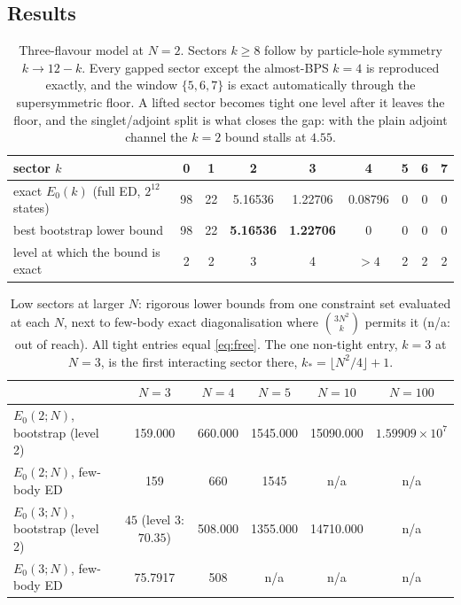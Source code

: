 \documentclass[10pt]{article}
\begin{document}
\subsection{Results}

\begin{table}[t]\centering\small
\begin{tabular}{@{}lcccccccc@{}}\toprule
sector $k$ & 0 & 1 & 2 & 3 & 4 & 5 & 6 & 7\\\midrule
exact $E_0(k)$ (full ED, $2^{12}$ states) & 98 & 22 & 5.16536 & 1.22706 & 0.08796 & 0 & 0 & 0\\
best bootstrap lower bound & 98 & 22 & \textbf{5.16536} & \textbf{1.22706} & 0 & 0 & 0 & 0\\
level at which the bound is exact & 2 & 2 & 3 & 4 & $>4$ & 2 & 2 & 2\\\bottomrule
\end{tabular}
\caption{Three-flavour model at $N=2$. Sectors $k\ge8$ follow by particle-hole symmetry $k\to12-k$. Every gapped
sector except the almost-BPS $k=4$ is reproduced exactly, and the window $\{5,6,7\}$ is exact automatically
through the supersymmetric floor. A lifted sector becomes tight one level after it leaves the floor, and the
singlet/adjoint split is what closes the gap: with the plain adjoint channel the $k=2$ bound stalls at $4.55$.}
\label{tab:N2}
\end{table}

\begin{table}[t]\centering\small
\begin{tabular}{@{}lccccc@{}}\toprule
 & $N=3$ & $N=4$ & $N=5$ & $N=10$ & $N=100$\\\midrule
$E_0(2;N)$, bootstrap (level 2) & 159.000 & 660.000 & 1545.000 & 15090.000 & $1.59909\times10^7$\\
$E_0(2;N)$, few-body ED & 159 & 660 & 1545 & n/a & n/a\\
$E_0(3;N)$, bootstrap (level 2) & $45$ (level 3: $70.35$) & 508.000 & 1355.000 & 14710.000 & n/a\\
$E_0(3;N)$, few-body ED & 75.7917 & 508 & n/a & n/a & n/a\\\bottomrule
\end{tabular}
\caption{Low sectors at larger $N$: rigorous lower bounds from one constraint set evaluated at each $N$, next to
few-body exact diagonalisation where $\binom{3N^2}{k}$ permits it (n/a: out of reach). All tight entries equal \eqref{eq:free}. The
one non-tight entry, $k=3$ at $N=3$, is the first interacting sector there, $k_*=\lfloor N^2/4\rfloor+1$.}
\label{tab:largeN}
\end{table}
\end{document}
